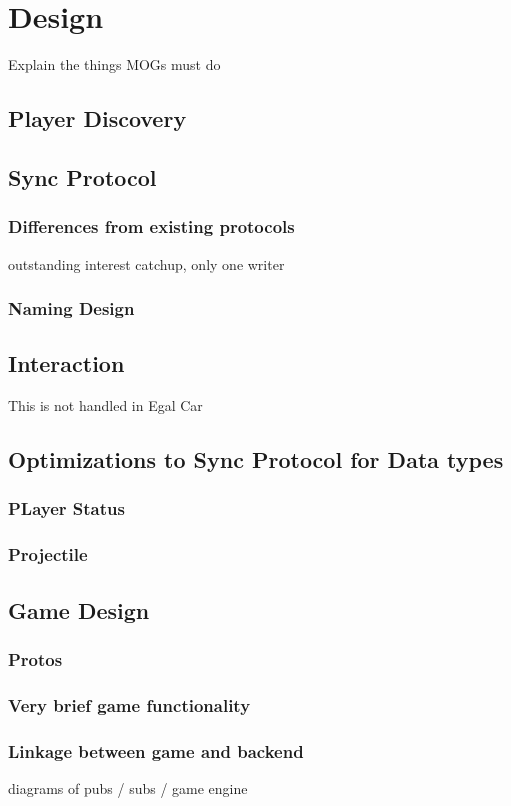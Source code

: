 \chapter{Design}
Explain the things MOGs must do 

\section{Player Discovery}

\section{Sync Protocol}
\subsection{Differences from existing protocols}
outstanding interest catchup, only one writer
\subsection{Naming Design}

\section{Interaction}
This is not handled in Egal Car

\section{Optimizations to Sync Protocol for Data types}
\subsection{PLayer Status}
\subsection{Projectile}

\section{Game Design}
\subsection{Protos}
\subsection{Very brief game functionality}
\subsection{Linkage between game and backend}
diagrams of pubs / subs / game engine
